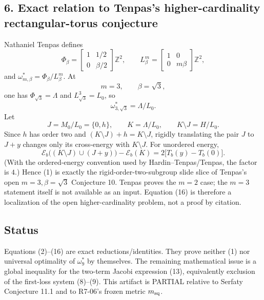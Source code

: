 \subsection*{6. Exact relation to Tenpas's higher-cardinality rectangular-torus conjecture}
Nathaniel Tenpas defines
\[
 \Phi_\beta=\begin{bmatrix}1&1/2\\0&\beta/2\end{bmatrix}\mathbb Z^2,
 \qquad
 L_\beta^m=\begin{bmatrix}1&0\\0&m\beta\end{bmatrix}\mathbb Z^2,
\]
and $\omega^*_{m,\beta}=\Phi_\beta/L_\beta^m$.  At
\[
 \boxed{m=3,\qquad\beta=\sqrt3,}\tag{15}
\]
one has $\Phi_{\sqrt3}=\Lambda$ and $L_{\sqrt3}^3=L_0$, so
\[
 \omega^*_{3,\sqrt3}=\Lambda/L_0.
\]
Let
\[
 J=M_0/L_0=\{0,h\},\qquad K=\Lambda/L_0,\qquad K\setminus J=H/L_0.
\]
Since $h$ has order two and $(K\setminus J)+h=K\setminus J$, rigidly translating the pair $J$ to $J+y$ changes only its cross-energy with $K\setminus J$.  For unordered energy,
\[
 \boxed{
 \mathcal E_b\big((K\setminus J)\cup(J+y)\big)-\mathcal E_b(K)
 =2\big[T_b(y)-T_b(0)\big].}\tag{16}
\]
(With the ordered-energy convention used by Hardin--Tenpas/Tenpas, the factor is $4$.)  Hence (1) is exactly the rigid-order-two-subgroup slide slice of Tenpas's open $m=3,\beta=\sqrt3$ Conjecture 10.  Tenpas proves the $m=2$ case; the $m=3$ statement itself is not available as an input.  Equation (16) is therefore a localization of the open higher-cardinality problem, not a proof by citation.

\subsection*{Status}
Equations (2)--(16) are exact reductions/identities.  They prove neither (1) nor universal optimality of $\omega^*_9$ by themselves.  The remaining mathematical issue is a global inequality for the two-term Jacobi expression (13), equivalently exclusion of the first-loss system (8)--(9).  This artifact is PARTIAL relative to Serfaty Conjecture 11.1 and to R7-06's frozen metric $m_{\rm sq}$.
